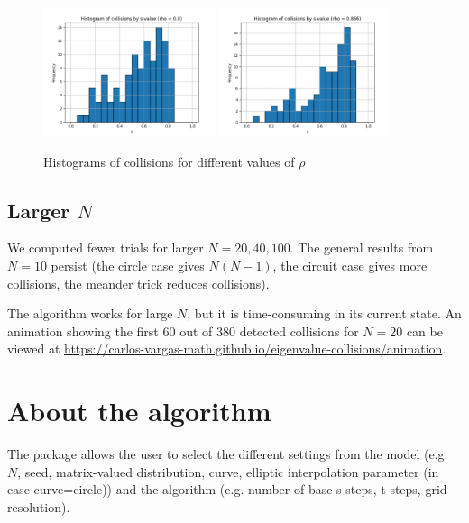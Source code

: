 \documentclass{article}
\begin{document}
\begin{figure}[htbp]
		\includegraphics[width=0.45\textwidth]{figures/Histogram_rho_4.pdf}
		\includegraphics[width=0.45\textwidth]{figures/Histogram_rho_5.pdf}

		\caption{Histograms of collisions for different values of $\rho$}
		\label{fig:elliptic_histograms}
	\end{figure}

	\subsection {Larger $N$}

	We computed fewer trials for larger $N=20, 40, 100$. The general results from $N=10$ persist 
	(the circle case gives $N(N-1)$, the circuit case gives more collisions, 
	the meander trick reduces collisions).
	
	The algorithm works for large $N$, but it is time-consuming in its current state.
	An animation showing the first $60$ out of $380$ detected collisions for $N=20$ 
	can be viewed at \url{https://carlos-vargas-math.github.io/eigenvalue-collisions/animation}.	

	\section{About the algorithm} \label{section:about-the-algorithm}

	The package allows the user to select the different settings from the model
	(e.g. $N$, seed, matrix-valued distribution, curve, 
	elliptic interpolation parameter (in case curve=circle)) 
	and the algorithm (e.g. number of base s-steps, t-steps, grid resolution).
\end{document}
